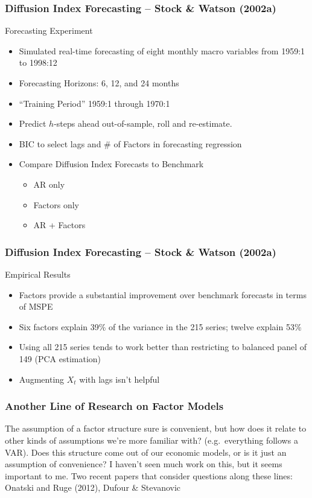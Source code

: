 \documentclass[handout]{beamer}
\begin{document}
\begin{frame}[c]\frametitle{Diffusion Index Forecasting -- Stock \& Watson (2002a)}
    
\begin{block}
	{Forecasting Experiment}
	\begin{itemize}
		\item Simulated real-time forecasting of eight monthly macro variables from 1959:1 to 1998:12
		\item Forecasting Horizons: 6, 12, and 24 months
		\item ``Training Period'' 1959:1 through 1970:1
		\item Predict $h$-steps ahead out-of-sample, roll and re-estimate.
		\item BIC to select lags and \# of Factors in forecasting regression
		\item Compare Diffusion Index Forecasts to Benchmark
			\begin{itemize}
				\item AR only
				\item Factors only
				\item AR + Factors
			\end{itemize}
	\end{itemize}
\end{block}

\end{frame}
\begin{frame}[c]\frametitle{Diffusion Index Forecasting -- Stock \& Watson (2002a)}
   \begin{block}
   	{Empirical Results}
   	\begin{itemize}
   		\item Factors provide a substantial improvement over benchmark forecasts in terms of MSPE
   		\item Six factors explain 39\% of the variance in the 215 series; twelve explain 53\%  
   		\item Using all 215 series tends to work better than restricting to balanced panel of 149 (PCA estimation)
   		\item Augmenting $X_t$ with lags isn't helpful
   	\end{itemize}
   \end{block}


\end{frame}

\begin{frame}
	\frametitle{Another Line of Research on Factor Models}

The assumption of a factor structure sure is convenient, but how does it relate to other kinds of assumptions we're more familiar with? (e.g.\ everything follows a VAR). Does this structure come out of our economic models, or is it just an assumption of convenience? I haven't seen much work on this, but it seems important to me. Two recent papers that consider questions along these lines: Onatski and Ruge (2012), Dufour \& Stevanovic
\end{frame}
\end{document}
